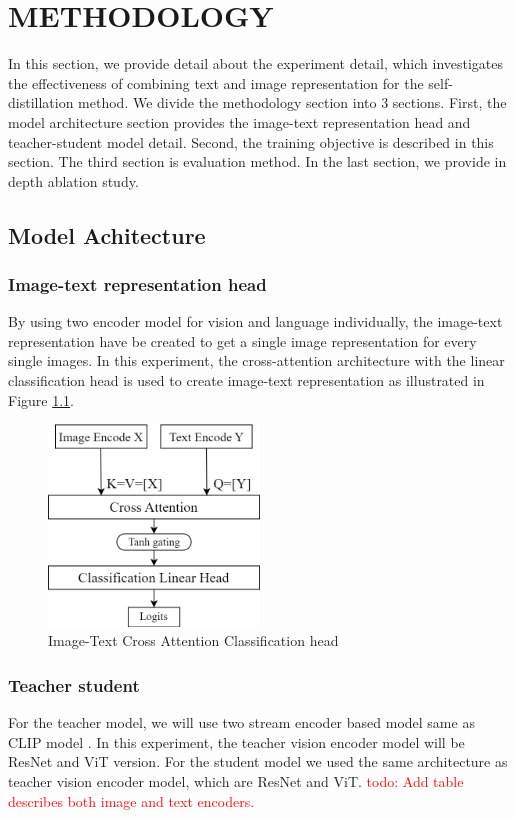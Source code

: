 \chapter{METHODOLOGY}
\label{ch:methodology}

In this section, we provide detail about the experiment detail, which investigates the effectiveness of combining text and image representation for the self-distillation method.
We divide the methodology section into 3 sections.
First, the model architecture section provides the image-text representation head and teacher-student model detail.
Second, the training objective is described in this section.
The third section is evaluation method.
In the last section, we provide in depth ablation study.

\section{Model Achitecture}
\subsection{Image-text representation head}
By using two encoder model for vision and language individually, the image-text representation have be created to get a single image representation for every single images.
In this experiment, the cross-attention  architecture with the linear classification head is used to create image-text representation as illustrated in Figure \ref{fig:cross_attention}.

\begin{figure}[h]
\caption{Image-Text Cross Attention Classification head}
\label{fig:cross_attention}
\centering
\includegraphics[width=0.5\textwidth]{Images/CrossAttention.png}
\end{figure}

\subsection{Teacher student}
For the teacher model, we will use two stream encoder based model same as CLIP model .
In this experiment, the teacher vision encoder model will be ResNet  and ViT  version.
For the student model we used the same architecture as teacher vision encoder model, which are ResNet and ViT.
\textcolor{red}{todo: Add table describes both image and text encoders.}

